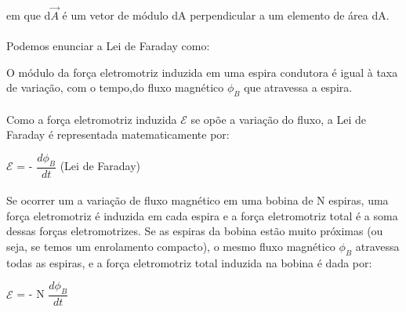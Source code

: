 \documentclass[a4paper, 12pt]{article}
\begin{document}
\paragraph{}em que d$\overrightarrow{A}$ é um vetor de módulo dA perpendicular a um elemento de área dA.

\paragraph{}Podemos enunciar a Lei de Faraday como:
\\
\begin{mdframed}[backgroundcolor=gray!20]
	\begin{center}
		O módulo da força eletromotriz induzida em uma espira condutora é igual à taxa de variação, com o tempo,do fluxo magnético $\phi_B$ que atravessa a espira.
		\end{center}
\end{mdframed}

\paragraph{}Como a força eletromotriz induzida $\mathcal  {E}$ se opõe a variação do fluxo, a Lei de Faraday é representada matematicamente por:
\\
\begin{mdframed}[backgroundcolor=gray!20]
	\begin{center}
		$\mathcal  {E}$ = - $\dfrac{d \phi_B}{dt}$ (Lei de Faraday)
		\end{center}
\end{mdframed}

\paragraph{}Se ocorrer um a variação de fluxo magnético em uma bobina de N espiras, uma força eletromotriz é induzida em cada espira e a força eletromotriz total é a soma dessas forças eletromotrizes. Se as espiras da bobina estão muito próximas (ou seja, se temos um enrolamento compacto), o mesmo fluxo magnético $\phi_B$ atravessa todas as espiras, e a força eletromotriz total induzida na bobina é dada por:
\\
\begin{mdframed}[backgroundcolor=gray!20]
	\begin{center}
		$\mathcal  {E}$ = - N $\dfrac{d \phi_B}{dt}$
		\end{center}
\end{mdframed}
\end{document}
